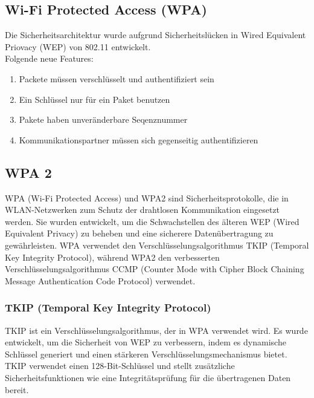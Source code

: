 \documentclass[12pt,a4paper]{article}
\begin{document}
	\subsection{Wi-Fi Protected Access (WPA)}
		Die Sicherheitsarchitektur wurde aufgrund Sicherheitslücken in Wired Equivalent Priovacy (WEP) von 802.11 entwickelt.\\
		Folgende neue Features:
		\begin{enumerate}
			\item Packete müssen verschlüsselt und authentifiziert sein
			\item Ein Schlüssel nur für ein Paket benutzen
			\item Pakete haben unveränderbare Seqenznummer
			\item Kommunikationspartner müssen sich gegenseitig authentifizieren
		\end{enumerate}

	\subsection{WPA 2}
		WPA (Wi-Fi Protected Access) und WPA2 sind Sicherheitsprotokolle, die in WLAN-Netzwerken zum Schutz der drahtlosen Kommunikation eingesetzt werden. Sie wurden entwickelt, um die Schwachstellen des älteren WEP (Wired Equivalent Privacy) zu beheben und eine sicherere Datenübertragung zu gewährleisten. WPA verwendet den Verschlüsselungsalgorithmus TKIP (Temporal Key Integrity Protocol), während WPA2 den verbesserten Verschlüsselungsalgorithmus CCMP (Counter Mode with Cipher Block Chaining Message Authentication Code Protocol) verwendet.

		\subsubsection{TKIP (Temporal Key Integrity Protocol)}
			TKIP ist ein Verschlüsselungsalgorithmus, der in WPA verwendet wird. Es wurde entwickelt, um die Sicherheit von WEP zu verbessern, indem es dynamische Schlüssel generiert und einen stärkeren Verschlüsselungsmechanismus bietet. TKIP verwendet einen 128-Bit-Schlüssel und stellt zusätzliche Sicherheitsfunktionen wie eine Integritätsprüfung für die übertragenen Daten bereit.
\end{document}
